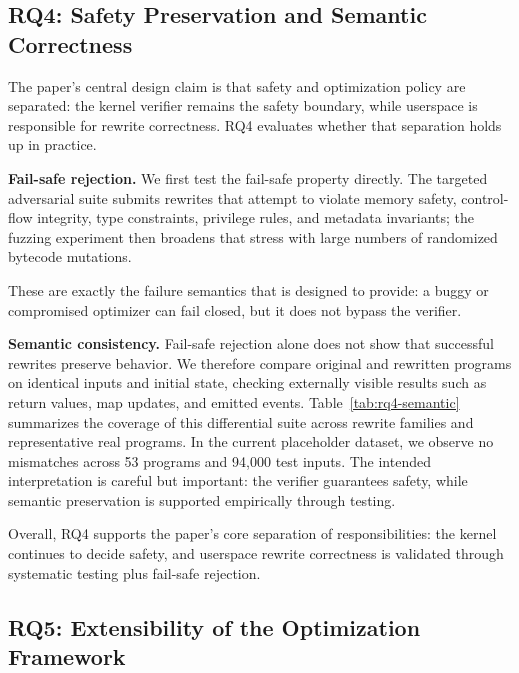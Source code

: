 \subsection{RQ4: Safety Preservation and Semantic Correctness}
\label{subsec:rq4}

The paper's central design claim is that safety and optimization policy are separated: the kernel verifier remains the safety boundary, while userspace is responsible for rewrite correctness. RQ4 evaluates whether that separation holds up in practice.

\noindent\textbf{Fail-safe rejection.}
We first test the fail-safe property directly. The targeted adversarial suite submits rewrites that attempt to violate memory safety, control-flow integrity, type constraints, privilege rules, and metadata invariants; the fuzzing experiment then broadens that stress with large numbers of randomized bytecode mutations.



These are exactly the failure semantics that \tool is designed to provide: a buggy or compromised optimizer can fail closed, but it does not bypass the verifier.

\noindent\textbf{Semantic consistency.}
Fail-safe rejection alone does not show that successful rewrites preserve behavior. We therefore compare original and rewritten programs on identical inputs and initial state, checking externally visible results such as return values, map updates, and emitted events. Table~\ref{tab:rq4-semantic} summarizes the coverage of this differential suite across rewrite families and representative real programs. In the current placeholder dataset, we observe no mismatches across 53 programs and 94{,}000 test inputs. The intended interpretation is careful but important: the verifier guarantees safety, while semantic preservation is supported empirically through testing.



Overall, RQ4 supports the paper's core separation of responsibilities: the kernel continues to decide safety, and userspace rewrite correctness is validated through systematic testing plus fail-safe rejection.

\subsection{RQ5: Extensibility of the Optimization Framework}
\label{subsec:rq5}

